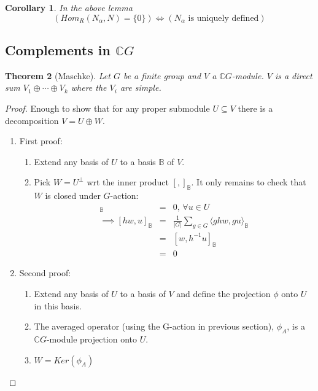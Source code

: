 \documentclass{sig-alternate}
\newtheorem{theorem}{Theorem}[section]
\newtheorem{corollary}[theorem]{Corollary}
\begin{document}
\begin{corollary}
In the above lemma
\[ (Hom_R(N_{\alpha}, N) = \{0\}) \Longleftrightarrow (N_{\alpha} \mbox{ is uniquely defined}) \]
\end{corollary}

\subsection{Complements in $\mathbb{C}G$}
\begin{theorem} [Maschke]
Let $G$ be a finite group and $V$ a $\mathbb{C}G$-module. $V$ is a direct sum $V_1\oplus\cdots\oplus V_k$ where the $V_i$ are simple.
\end{theorem}
\begin{proof}
Enough to show that for any proper submodule $U \subseteq V$ there is a decomposition $V = U \oplus W$.
\begin{enumerate}
\item First proof: 
   \begin{enumerate}
   \item Extend any basis of $U$ to a basis $\mathbb{B}$ of $V$.
   \item Pick $W = U^{\perp}$ wrt the inner product $[,]_{\mathbb{B}}$. It only remains to check that $W$ is closed under $G$-action:
       \begin{eqnarray*}
       [w, u]_{\mathbb{B}} & = & 0 \mbox{, }\forall u \in U\\
       \implies [hw, u]_{\mathbb{B}} & = &  \frac{1}{|G|}\sum_{g \in G} \langle ghw, gu\rangle_{\mathbb{B}} \\
       & = & [w, h^{-1}u]_{\mathbb{B}} \\
       & = & 0
       \end{eqnarray*}
    \end{enumerate}
 \item Second proof:
    \begin{enumerate}
    \item Extend any basis of $U$ to a basis of $V$ and define the projection $\phi$ onto $U$ in this basis.
    \item The averaged operator (using the G-action in previous section), $\phi_A$, is a $\mathbb{C}G$-module projection onto $U$.
    \item $W = Ker(\phi_A)$
    \end{enumerate}
\end{enumerate}
\end{proof}
\end{document}

